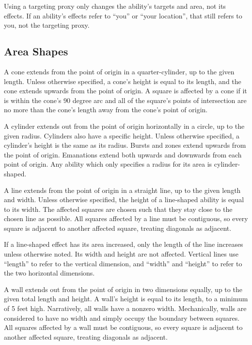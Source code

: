       Using a targeting proxy only changes the ability's targets and area, not its effects.
      If an ability's effects refer to ``you'' or ``your location'', that still refers to you, not the targeting proxy.

  \subsection{Area Shapes}\label{Area Shapes}

     A cone extends from the point of origin in a quarter-cylinder, up to the given length.
    Unless otherwise specified, a cone's height is equal to its length, and the cone extends upwards from the point of origin.
    A square is affected by a cone if it is within the cone's 90 degree arc and all of the square's points of intersection are no more than the cone's length away from the cone's point of origin.

     A cylinder extends out from the point of origin horizontally in a circle, up to the given radius.
    Cylinders also have a specific height.
    Unless otherwise specified, a cylinder's height is the same as its radius.
    Bursts and zones extend upwards from the point of origin.
    Emanations extend both upwards and downwards from each point of origin.
    Any ability which only specifies a radius for its area is cylinder-shaped.

     A line extends from the point of origin in a straight line, up to the given length and width.
    Unless otherwise specified, the height of a line-shaped ability is equal to its width.
    The affected squares are chosen such that they stay close to the chosen line as possible.
    All squares affected by a line must be contiguous, so every square is adjacent to another affected square, treating diagonals as adjacent.

    If a line-shaped effect has its area increased, only the length of the line increases unless otherwise noted.
    Its width and height are not affected.
    Vertical lines use ``length'' to refer to the vertical dimension, and ``width'' and ``height'' to refer to the two horizontal dimensions.

     A wall extends out from the point of origin in two dimensions equally, up to the given total length and height.
    A wall's height is equal to its length, to a minimum of 5 feet high.
    Narratively, all walls have a nonzero width.
    Mechanically, walls are considered to have no width and simply occupy the boundary between squares.
    All squares affected by a wall must be contiguous, so every square is adjacent to another affected square, treating diagonals as adjacent.

